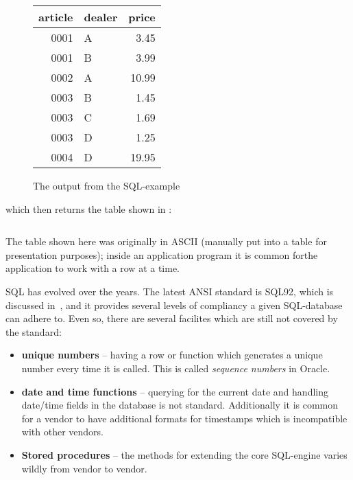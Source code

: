 \begin{figure}[htbp]
  \begin{center}
    \begin{tabular}{|r|l|r|}
\hline\hline
 article & dealer & price\\
\hline
    0001 & A      &  3.45\\
    0001 & B      &  3.99\\
    0002 & A      & 10.99\\
    0003 & B      &  1.45\\
    0003 & C      &  1.69\\
    0003 & D      &  1.25\\
    0004 & D      & 19.95\\
\hline
    \end{tabular}

    \caption{The output from the SQL-example}
    \label{fig:mysql-tutorial-example-output}
  \end{center}
\end{figure}
which then returns the table shown in :

\begin{verbatim}
\end{verbatim}

The table shown here was originally in ASCII (manually put into a
table for presentation purposes); inside an application program it is
common forthe application to work with a row at a time.



SQL has evolved over the years.  The latest ANSI standard is SQL92,
which is discussed in~\cite{understanding-the-new-sql}, and it
provides several levels of compliancy a given SQL-database can adhere
to.  Even so, there are several facilites which are still not covered
by the standard:

\begin{itemize}
\item \textbf{unique numbers} -- having a row or function which
  generates a unique number every time it is called.  This is called
  \textit{sequence numbers} in Oracle.
\item \textbf{date and time functions} -- querying for the current
  date and handling date/time fields in the database is not standard.
  Additionally it is common for a vendor to have additional formats
  for timestamps which is incompatible with other vendors.
\item \textbf{Stored procedures} -- the methods for extending the core
  SQL-engine varies wildly from vendor to vendor.
\end{itemize}

